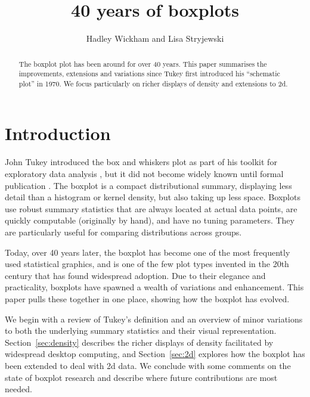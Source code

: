 \documentclass[oneside]{article}
\title{40 years of boxplots}
\author{Hadley Wickham and Lisa Stryjewski}
\begin{document}
\maketitle 

\begin{abstract} 
  
  The boxplot plot has been around for over 40 years. This paper summarises the improvements, extensions and variations since Tukey first introduced his ``schematic plot'' in 1970. We focus particularly on richer displays of density and extensions to 2d.

\end{abstract}

\section{Introduction}


John Tukey introduced the box and whiskers plot as part of his toolkit for exploratory data analysis \citep{tukey:1970}, but it did not become widely known until formal publication \citep{tukey:1977}. The boxplot is a compact distributional summary, displaying less detail than a histogram or kernel density, but also taking up less space. Boxplots use robust summary statistics that are always located at actual data points, are quickly computable (originally by hand), and have no tuning parameters. They are particularly useful for comparing distributions across groups.

Today, over 40 years later, the boxplot has become one of the most frequently used statistical graphics, and is one of the few plot types invented in the 20th century that has found widespread adoption. Due to their elegance and practicality, boxplots have spawned a wealth of variations and enhancement. This paper pulls these together in one place, showing how the boxplot has evolved.

We begin with a review of Tukey's definition and an overview of minor variations to both the underlying summary statistics and their visual representation. Section~\ref{sec:density} describes the richer displays of density facilitated by widespread desktop computing, and Section~\ref{sec:2d} explores how the boxplot has been extended to deal with 2d data. We conclude with some comments on the state of boxplot research and describe where future contributions are most needed.
\end{document}
